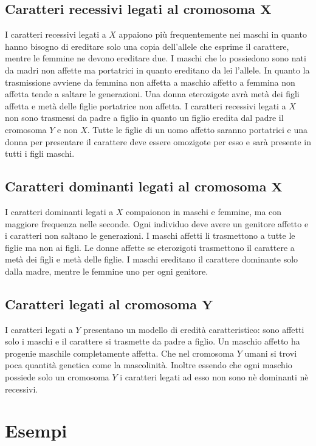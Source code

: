 	\subsection{Caratteri recessivi legati al cromosoma $\mathbf{X}$}
	I caratteri recessivi legati a $X$ appaiono pi\`u frequentemente nei maschi in quanto hanno bisogno di ereditare solo una copia dell'allele che esprime il carattere, mentre le femmine ne devono ereditare due.
	I maschi che lo possiedono sono nati da madri non affette ma portatrici in quanto ereditano da lei l'allele.
	In quanto la trasmissione avviene da femmina non affetta a maschio affetto a femmina non affetta tende a saltare le generazioni. 
	Una donna eterozigote avr\`a met\`a dei figli affetta e met\`a delle figlie portatrice non affetta. 
	I caratteri recessivi legati a $X$ non sono trasmessi da padre a figlio in quanto un figlio eredita dal padre il cromosoma $Y$ e non $X$.
	Tutte le figlie di un uomo affetto saranno portatrici e una donna per presentare il carattere deve essere omozigote per esso e sar\`a presente in tutti i figli maschi. 

	\subsection{Caratteri dominanti legati al cromosoma $\mathbf{X}$}
	I caratteri dominanti legati a $X$ compaionon in maschi e femmine, ma con maggiore frequenza nelle seconde. 
	Ogni individuo deve avere un genitore affetto e i caratteri non saltano le generazioni.
	I maschi affetti li trasmettono a tutte le figlie ma non ai figli. 
	Le donne affette se eterozigoti trasmettono il carattere a met\`a dei figli e met\`a delle figlie. 
	I maschi ereditano il carattere dominante solo dalla madre, mentre le femmine uno per ogni genitore. 

	\subsection{Caratteri legati al cromosoma $\mathbf{Y}$}
	I caratteri legati a $Y$ presentano un modello di eredit\`a caratteristico: sono affetti solo i maschi e il carattere si trasmette da padre a figlio.
	Un maschio affetto ha progenie maschile completamente affetta. 
	Che nel cromosoma $Y$ umani si trovi poca quantit\`a genetica come la mascolinit\`a.
	Inoltre essendo che ogni maschio possiede solo un cromosoma $Y$ i caratteri legati ad esso non sono n\`e dominanti n\`e recessivi.

\section{Esempi}
	
